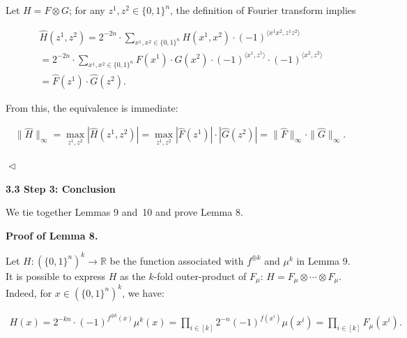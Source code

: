 \documentclass[10pt,a4paper]{article}
\begin{document}
Let $H=F\otimes G$; for any $z^{1},z^{2}\in\{0,1\}^{n}$, the definition of Fourier transform implies\par


\[\begin{gathered}
\displaystyle\widehat{H}(z^{1},z^{2}) \displaystyle=2^{-2n}\cdot\sum\nolimits_{x^{1},x^{2}\in\{0,1\}^{n}}H(x^{1},x^{2})\cdot(-1)^{\langle x^{1}x^{2},z^{1}z^{2}\rangle} \\
\displaystyle=2^{-2n}\cdot\sum\nolimits_{x^{1},x^{2}\in\{0,1\}^{n}}F(x^{1})\cdot G(x^{2})\cdot(-1)^{\langle x^{1},z^{1}\rangle}\cdot(-1)^{\langle x^{2},z^{2}\rangle} \\
\displaystyle=\widehat{F}(z^{1})\cdot\widehat{G}(z^{2}).
\end{gathered}\]


From this, the equivalence is immediate:\par


\[\begin{gathered}
\|\widehat{H}\|_{\infty}=\max_{z^{1},z^{2}}|\widehat{H}(z^{1},z^{2})|=\max_{z^{1},z^{2}}|\widehat{F}(z^{1})|\cdot|\widehat{G}(z^{2})|=\|\widehat{F}\|_{\infty}\cdot\|\widehat{G}\|_{\infty}.\
\end{gathered}\]


$\vartriangleleft$\par






\par\medskip\noindent\textbf{
3.3 Step 3: Conclusion}\par




We tie together Lemmas 9 and 10 and prove Lemma 8.\par




\par\medskip\noindent\textbf{Proof of Lemma 8.}\par




Let $H\colon(\{0,1\}^{n})^{k}\to\mathbb{R}$ be the function associated with $f^{\oplus k}$ and $\mu^{k}$ in Lemma 9. It is possible to express $H$ as the $k$-fold outer-product of $F_{\mu}$: $H=F_{\mu}\otimes\cdots\otimes F_{\mu}$. Indeed, for $x\in(\{0,1\}^{n})^{k}$, we have:\par


\[\begin{gathered}
H(x)=2^{-kn}\cdot(-1)^{f^{\oplus k}(x)}\mu^{k}(x)=\prod\nolimits_{i\in[k]}2^{-n}(-1)^{f(x^{i})}\mu(x^{i})=\prod\nolimits_{i\in[k]}F_{\mu}(x^{i}).
\end{gathered}\]
\end{document}
